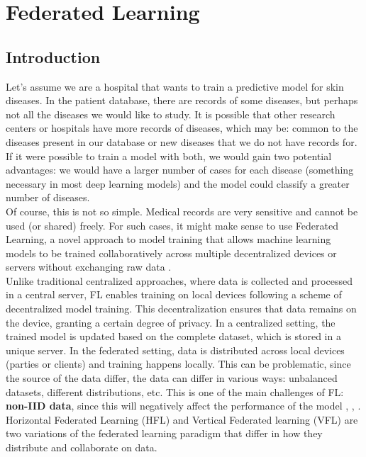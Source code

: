 \chapter{Federated Learning}
\label{ch:Federated_Learning}

\section{Introduction}
Let's assume we are a hospital that wants to train a predictive model for skin diseases. In the patient database, there are records of some diseases, but perhaps not all the diseases we would like to study. It is possible that other research centers or hospitals have more records of diseases, which may be: common to the diseases present in our database or new diseases that we do not have records for. If it were possible to train a model with both, we would gain two potential advantages: we would have a larger number of cases for each disease (something necessary in most deep learning models) and the model could classify a greater number of diseases.\\
Of course, this is not so simple. Medical records are very sensitive and cannot be used (or shared) freely. For such cases, it might make sense to use Federated Learning, a novel approach to model training that allows
 machine learning models to be trained collaboratively across multiple decentralized devices or servers
 without exchanging raw data \cite{mcmahan2023a}.\\

 Unlike traditional centralized approaches, where data is collected and processed in a central server, FL enables training on local devices following a scheme of decentralized model training.
 This decentralization ensures that data remains on the device, granting a certain degree of privacy.
 In a centralized setting, the trained model is updated based on the complete dataset, which is stored in a unique server. In the federated setting, data is distributed across local devices (parties or clients) and training happens locally. This can be problematic, since the source
 of the data differ, the data can differ in various ways: unbalanced datasets, different distributions, etc. This is one of the main challenges of FL:
 \textbf{non-IID data}, since this will negatively affect the performance of the model \cite{li2020}, \cite{zhao2018}, \cite{li2021}.\\
Horizontal Federated Learning (HFL) and Vertical Federated learning (VFL) are two variations of the federated learning paradigm that differ in how they distribute and collaborate on data.

